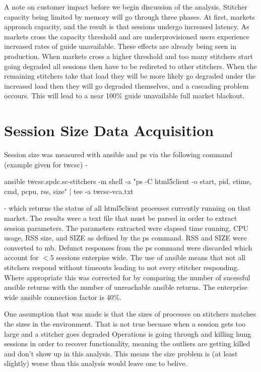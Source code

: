 \documentclass{article}
\begin{document}
A note on customer impact before we begin discussion of the analysis. Stitcher capacity being limited by memory will go through three phases. At first, markets approach capacity, and the result is that sessions undergo increased latency. As markets cross the capacity threshold and are underprovisioned users experience increased rates of guide unavailable. These effects are already being seen in production. When markets cross a higher threshold and too many stitchers start going degraded all sessions then have to be redireted to other stitchers. When the remaining stitchers take that load they will be more likely go degraded under the increased load then they will go degraded themselves, and a cascading problem occours. This will lead to a near 100\% guide unavailable full market blackout. 



\section{Session Size Data Acquisition}

Session size was measured with ansible and ps via the following command (example given for twcsc) - 

\noindent ansible twcsc.spdc.sc-stitchers -m shell -a "ps -C html5client -o start, pid, etime, cmd, pcpu, rss, size" $|$ tee -a twcsc-vca.txt

\noindent - which returns the status of all html5client processes currently running on that market. The results were a text file that must be parsed in order to extract session parameters. The parameters extracted were elapsed time running, CPU usage, RSS size, and SIZE as defined by the ps command. RSS and SIZE were converted to mb. Defunct responses from the ps command were discarded which account for $<5$ sessions enterpise wide. The use of ansible means that not all stitchers respond without timeouts leading to not every stitcher responding. Where appropriate this was corrected for by comparing the number of sucessful ansible returns with the number of unreachable ansible returns. The enterprise wide ansible connection factor is 40\%. 

One assumption that was made is that the sizes of processes on stitchers matches the sizes in the environment. That is not true becuase when a session gets too large and a stitcher goes degraded Operations is going through and killing hung sessions in order to recover functionality, meaning the outliers are getting killed and don't show up in this analysis. This means the size problem is (at least slightly) worse than this analysis would leave one to belive. 
\end{document}
